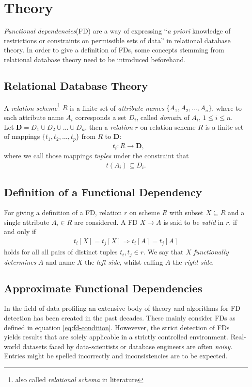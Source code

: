 \newpage
\section{Theory}
\emph{Functional dependencies}(FD) are a way of expressing ``\emph{a priori} knowledge of restrictions or constraints on permissible sets of data''\cite[p.42]{MAI83} in relational database theory.
In order to give a definition of FDs, some concepts stemming from relational database theory need to be introduced beforehand.

\subsection{Relational Database Theory}
A \emph{relation scheme}\footnote{also called \emph{relational schema} in literature\cite[p.21]{ABE19}} $R$ is a finite set of \emph{attribute names} $\{A_1, A_2, \dots, A_n\}$, where to each attribute name $A_i$ corresponds a set $D_i$, called \emph{domain} of $A_i$, $1 \leq i \leq n$. \\

Let $\boldsymbol{D} = D_1 \cup D_2 \cup \dots \cup D_n$, then a \emph{relation} $r$ on relation scheme $R$ is a finite set of mappings $\{t_1, t_2, \dots, t_p\}$ from $R$ to $\boldsymbol{D}$:
\begin{align}
  &t_i: R \to \boldsymbol{D},
\end{align}
where we call those mappings \emph{tuples} under the constraint that \cite[p.2]{MAI83}
\begin{align}
  t(A_i) \subseteq D_i.
\end{align}

\subsection{Definition of a Functional Dependency}
For giving a definition of a FD, relation $r$ on scheme $R$ with subset $X \subseteq R$ and a single attribute $A_i \in R$ are considered.
A FD $X \to A$ is said to be \emph{valid} in $r$, if and only if
\begin{align}\label{eq:fd-condition}
  t_i[X] = t_j[X] \Rightarrow t_i[A] = t_j[A]
\end{align}
holds for all all pairs of distinct tuples $t_i,t_j \in r$.\cite[p.21]{ABE19} 
We say that $X$ \emph{functionally determines} $A$\cite[p.43]{MAI83} and name $X$ the \emph{left side}, whilst calling $A$ the \emph{right side}.

\subsection{Approximate Functional Dependencies}
In the field of data profiling an extensive body of theory and algorithms for FD detection has been created in the past decades.
These mainly consider FDs as defined in equation \ref{eq:fd-condition}.
Howevever, the strict detection of FDs yields results that are solely applicable in a strictly controlled environment.
Real-world datasets faced by data-scientists or database engineers are often \emph{noisy}.
Entries might be spelled incorrectly and inconsistencies are to be expected. \\

